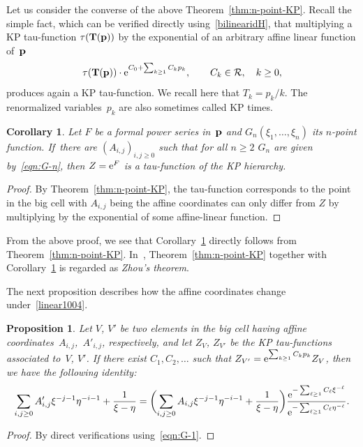 \documentclass[11pt]{article}
\numberwithin{equation}{section}
\newcommand{\beq}{\begin{equation}}
\newcommand{\eeq}{\end{equation}}
\numberwithin{equation}{section}
\newtheorem{Corollary}[Theorem]{Corollary}
\newtheorem{Proposition}[Theorem]{Proposition}
 { \theoremstyle{definition}
\newtheorem{Definition}[Theorem]{Definition}
\newtheorem{Note}[Theorem]{Note}
\newtheorem{Example}[Theorem]{Example}
\newtheorem{Remark}[Theorem]{Remark} }
\begin{document}
Let us consider the converse of the above Theorem~\ref{thm:n-point-KP}. Recall the simple fact, which can be verified directly using~\eqref{bilinearidH}, that
multiplying a KP tau-function $\tau({\bf T}({\bf p}))$
by the exponential of an arbitrary affine linear function of~${\bf p}$
\beq\label{linear1004}
\tau({\bf T}({\bf p})) \cdot {\rm e}^{C_0+\sum_{k\ge1} C_k p_k}, \qquad C_k\in\mathcal{R},\quad k\ge0,
\eeq
produces again a KP tau-function. We recall here that $T_k=p_k/k$. The renormalized variables~$p_k$ are also sometimes called KP times.

\begin{Corollary}\label{conversthmA}
Let $F$ be a formal power series in~${\bf p}$ and $G_n(\xi_1,\dots,\xi_n)$ its $n$-point function.
If~there are $(A_{i,j})_{i,j\geq 0}$ such that for all $n\ge2$
$G_n$ are given by~\eqref{eqn:G-n},
then $Z= {\rm e}^F$ is a tau-function of the KP hierarchy.
\end{Corollary}
\begin{proof}
By Theorem~\ref{thm:n-point-KP},
the tau-function corresponds to the point in the big cell with $A_{i,j}$ being the affine coordinates
can only differ from $Z$ by multiplying by the exponential of some affine-linear function.
\end{proof}

\begin{Remark}
From the above proof, we see that Corollary~\ref{conversthmA} directly follows from Theorem~\ref{thm:n-point-KP}. In~\cite{ABDBKS},
Theorem~\ref{thm:n-point-KP} together with Corollary~\ref{conversthmA} is regarded as {\it Zhou's theorem}.
\end{Remark}

The next proposition describes how the affine coordinates change under~\eqref{linear1004}.

\begin{Proposition}\label{VVprimelinear}
Let $V$, $V'$ be two elements in the big cell having affine coordinates~$A_{i,j}$,~$A'_{i,j}$, respectively,
and let $Z_V$, $Z_{V'}$ be the KP tau-functions associated to~$V$, $V'$. If there exist $C_1,C_2,\dots$ such that
$
Z_{V'} = {\rm e}^{\sum_{k\ge1} C_k p_k} Z_V$,
then we have the following identity:
\begin{gather*}%
\sum_{i,j \geq 0} A'_{i,j} \xi^{-j-1} \eta^{-i-1} + \frac1{\xi-\eta} = \biggl(\sum_{i,j \geq 0} A_{i,j} \xi^{-j-1} \eta^{-i-1} + \frac1{\xi-\eta}\biggr)
\frac{{\rm e}^{-\sum_{\ell\ge1} C_\ell \xi^{-\ell}}}{{\rm e}^{-\sum_{\ell\ge1} C_\ell \eta^{-\ell}}}.
\end{gather*}
\end{Proposition}
\begin{proof}
By direct verifications using~\eqref{eqn:G-1}.
\end{proof}
\end{document}
